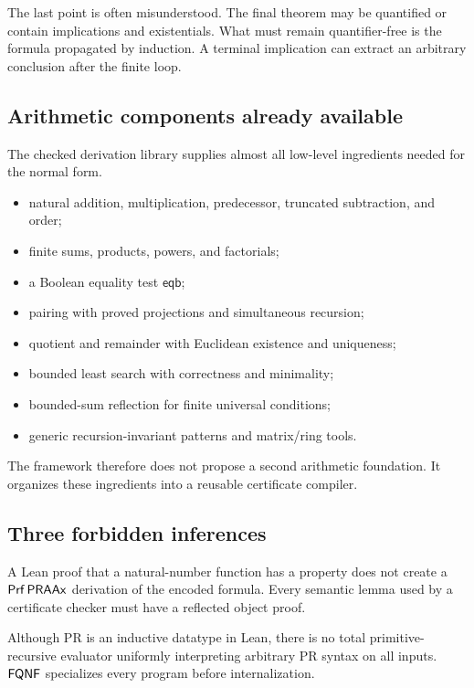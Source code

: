 The last point is often misunderstood.  The final theorem may be quantified or
contain implications and existentials.  What must remain quantifier-free is the
formula propagated by induction.  A terminal implication can extract an
arbitrary conclusion after the finite loop.

\subsection{Arithmetic components already available}

The checked derivation library supplies almost all low-level ingredients needed
for the normal form.

\begin{itemize}
\item natural addition, multiplication, predecessor, truncated subtraction,
and order;
\item finite sums, products, powers, and factorials;
\item a Boolean equality test \(\mathsf{eqb}\);
\item pairing with proved projections and simultaneous recursion;
\item quotient and remainder with Euclidean existence and uniqueness;
\item bounded least search with correctness and minimality;
\item bounded-sum reflection for finite universal conditions;
\item generic recursion-invariant patterns and matrix/ring tools.
\end{itemize}

The framework therefore does not propose a second arithmetic foundation.  It
organizes these ingredients into a reusable certificate compiler.

\subsection{Three forbidden inferences}

\begin{warning}
A Lean proof that a natural-number function has a property does not create a
\(\mathsf{Prf}\,\mathsf{PRAAx}\) derivation of the encoded formula.  Every semantic lemma used
by a certificate checker must have a reflected object proof.
\end{warning}

\begin{warning}
Although \(\mathrm{PR}\) is an inductive datatype in Lean, there is no total
primitive-recursive evaluator uniformly interpreting arbitrary PR syntax on
all inputs.  \(\mathsf{FQNF}\) specializes every program before internalization.
\end{warning}

